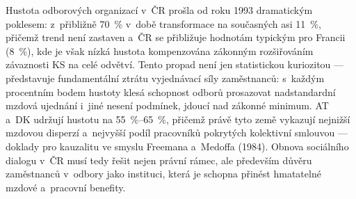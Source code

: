 Hustota odborových organizací v~ČR prošla od roku 1993 dramatickým poklesem: z~přibližně \SI{70}{\percent} v~době transformace na současných asi \SI{11}{\percent}, přičemž trend není zastaven a~ČR se přibližuje hodnotám typickým pro Francii (\SI{8}{\percent}), kde je však nízká hustota kompenzována zákonným rozšiřováním závaznosti \ac{KS} na celé odvětví.
Tento propad není jen statistickou kuriozitou --- představuje fundamentální ztrátu vyjednávací síly zaměstnanců: s~každým procentním bodem hustoty klesá schopnost odborů prosazovat nadstandardní mzdová ujednání i~jiné nesení podmínek, jdoucí nad zákonné minimum.
AT a~DK udržují hustotu na \SIrange{55}{65}{\percent}, přičemž právě tyto země vykazují nejnižší mzdovou disperzí a~nejvyšší podíl pracovníků pokrytých kolektivní smlouvou --- doklady pro kauzalitu ve smyslu Freemana a~Medoffa (1984).
Obnova sociálního dialogu v~ČR musí tedy řešit nejen právní rámec, ale především důvěru zaměstnanců v~odbory jako instituci, která je schopna přinést hmatatelné mzdové a~pracovní benefity.


